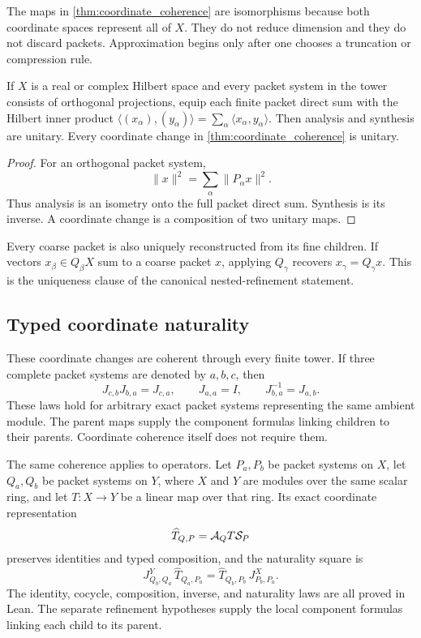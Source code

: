 \begin{remark}\label{rem:refinement_reduction}
The maps in \cref{thm:coordinate_coherence} are isomorphisms because both coordinate spaces represent all of $X$.  They do not reduce dimension and they do not discard packets.  Approximation begins only after one chooses a truncation or compression rule.
\end{remark}

\begin{corollary}\label{cor:orthogonal_isometry}
If $X$ is a real or complex Hilbert space and every packet system in the tower consists of orthogonal projections, equip each finite packet direct sum with the Hilbert inner product $\langle(x_\alpha),(y_\alpha)\rangle=\sum_\alpha\langle x_\alpha,y_\alpha\rangle$. Then analysis and synthesis are unitary. Every coordinate change in \cref{thm:coordinate_coherence} is unitary.
\end{corollary}

\begin{proof}
For an orthogonal packet system,
\[
\|x\|^2=\sum_\alpha\|P_\alpha x\|^2.
\]
Thus analysis is an isometry onto the full packet direct sum.  Synthesis is its inverse.  A coordinate change is a composition of two unitary maps.
\end{proof}

Every coarse packet is also uniquely reconstructed from its fine children.  If vectors $x_\beta\in Q_\beta X$ sum to a coarse packet $x$, applying $Q_\gamma$ recovers $x_\gamma=Q_\gamma x$.  This is the uniqueness clause of the canonical nested-refinement statement.

\subsection{Typed coordinate naturality}
These coordinate changes are coherent through every finite tower. If three
complete packet systems are denoted by $a,b,c$, then
\[
J_{c,b}J_{b,a}=J_{c,a},
\qquad J_{a,a}=I,
\qquad J_{b,a}^{-1}=J_{a,b}.
\]
These laws hold for arbitrary exact packet systems representing the same
ambient module. The parent maps supply the component formulas linking
children to their parents. Coordinate coherence itself does not require them.

The same coherence applies to operators. Let $P_a,P_b$ be packet systems on $X$, let $Q_a,Q_b$ be packet
systems on $Y$, where $X$ and $Y$ are modules over the same scalar ring, and let $T:X\to Y$ be a linear map over that ring. Its exact coordinate
representation
\[
\widehat T_{Q,P}=\mathcal A_QT\mathcal S_P
\]
preserves identities and typed composition, and the naturality square is
\[
\boxed{
J^Y_{Q_b,Q_a}\,\widehat T_{Q_a,P_a}
=
\widehat T_{Q_b,P_b}\,J^X_{P_b,P_a}.
}
\]
The identity, cocycle, composition, inverse, and naturality laws are all proved
in Lean. The separate refinement hypotheses supply the local component
formulas linking each child to its parent.


